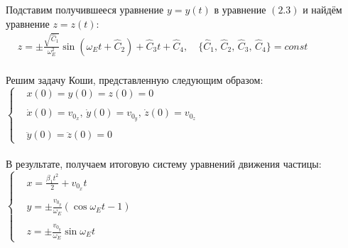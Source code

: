 \documentclass[oneside,final,14pt]{extarticle}
\begin{document}
	\noindent Подставим получившееся уравнение $y = y(t)$ в уравнение $(2.3)$ и найдём уравнение $z = z(t)$: \\
	
	\begin{math}
		\begin{aligned}
			& z = \pm \frac{\sqrt{\widehat{C}_1}}{\omega_{E}^{2}} \sin{(\omega_{E}t + \widehat{C}_{2})} + \widehat{C}_{3}t +  \widehat{C}_{4}, \quad \{\widehat{C}_{1},\, \widehat{C}_{2},\, \widehat{C}_{3},\, \widehat{C}_{4}\} = const
		\end{aligned}
	\end{math} \\\\
	
	\noindent Решим задачу Коши, представленную следующим образом: \\
	
	\begin{math}
		\left\{
		\begin{aligned}
			& x(0) = y(0) = z(0) = 0  \\\\
			& \dot{x}(0) = v_{0_{x}},\, \dot{y}(0) = v_{0_{y}},\, \dot{z}(0) = v_{0_{z}}\\\\
			& \ddot{y}(0) = \ddot{z}(0) = 0
		\end{aligned}
		\right.
	\end{math} \\\\
	
	\noindent В результате, получаем итоговую систему уравнений движения частицы: \\
	
	\begin{math}
		\left\{
		\begin{aligned}
			& x = \frac{\beta_{1}t^{2}}{2} + v_{0_{x}}t  \\\\
			& y = \pm \frac{v_{0_{y}}}{\omega_{E}} (\cos{\omega_{E}t} - 1) \\\\
			& z = \pm \frac{v_{0_{y}}}{\omega_{E}} \sin{\omega_{E}t}
		\end{aligned}
		\right.
	\end{math}
	
\end{document}
